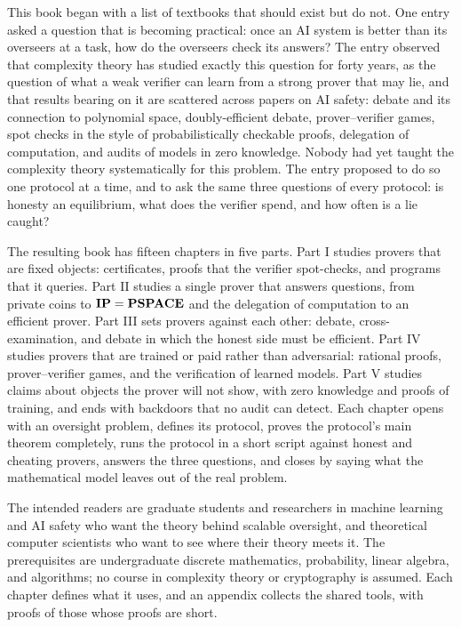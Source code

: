 
This book began with a list of textbooks that should exist but do not. One entry asked a question that is becoming practical: once an AI system is better than its overseers at a task, how do the overseers check its answers? The entry observed that complexity theory has studied exactly this question for forty years, as the question of what a weak verifier can learn from a strong prover that may lie, and that results bearing on it are scattered across papers on AI safety: debate and its connection to polynomial space, doubly-efficient debate, prover–verifier games, spot checks in the style of probabilistically checkable proofs, delegation of computation, and audits of models in zero knowledge. Nobody had yet taught the complexity theory systematically for this problem. The entry proposed to do so one protocol at a time, and to ask the same three questions of every protocol: is honesty an equilibrium, what does the verifier spend, and how often is a lie caught?

The resulting book has fifteen chapters in five parts. Part I studies provers that are fixed objects: certificates, proofs that the verifier spot-checks, and programs that it queries. Part II studies a single prover that answers questions, from private coins to $\mathbf{IP}=\mathbf{PSPACE}$ and the delegation of computation to an efficient prover. Part III sets provers against each other: debate, cross-examination, and debate in which the honest side must be efficient. Part IV studies provers that are trained or paid rather than adversarial: rational proofs, prover–verifier games, and the verification of learned models. Part V studies claims about objects the prover will not show, with zero knowledge and proofs of training, and ends with backdoors that no audit can detect. Each chapter opens with an oversight problem, defines its protocol, proves the protocol's main theorem completely, runs the protocol in a short script against honest and cheating provers, answers the three questions, and closes by saying what the mathematical model leaves out of the real problem.

The intended readers are graduate students and researchers in machine learning and AI safety who want the theory behind scalable oversight, and theoretical computer scientists who want to see where their theory meets it. The prerequisites are undergraduate discrete mathematics, probability, linear algebra, and algorithms; no course in complexity theory or cryptography is assumed. Each chapter defines what it uses, and an appendix collects the shared tools, with proofs of those whose proofs are short.

